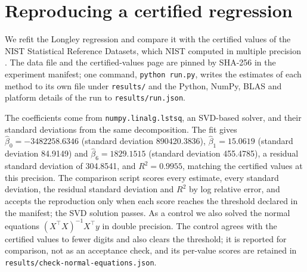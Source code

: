 \section{Reproducing a certified regression}\label{sec:res_longley}

We refit the Longley regression \cite{longley1967} and compare it with the certified values of the NIST Statistical Reference Datasets, which NIST computed in multiple precision \cite{nist-strd-longley}. The data file and the certified-values page are pinned by SHA-256 in the experiment manifest; one command, \texttt{python run.py}, writes the estimates of each method to its own file under \texttt{results/} and the Python, NumPy, BLAS and platform details of the run to \texttt{results/run.json}.

The coefficients come from \texttt{numpy.linalg.lstsq}, an SVD-based solver, and their standard deviations from the same decomposition. The fit gives $\hat\beta_0 = -3482258.6346$ (standard deviation 890420.3836), $\hat\beta_1 = 15.0619$ (standard deviation 84.9149) and $\hat\beta_6 = 1829.1515$ (standard deviation 455.4785), a residual standard deviation of 304.8541, and $R^2 = 0.9955$, matching the certified values at this precision. The comparison script scores every estimate, every standard deviation, the residual standard deviation and $R^2$ by log relative error, and accepts the reproduction only when each score reaches the threshold declared in the manifest; the SVD solution passes. As a control we also solved the normal equations $(X^\top X)^{-1} X^\top y$ in double precision. The control agrees with the certified values to fewer digits and also clears the threshold; it is reported for comparison, not as an acceptance check, and its per-value scores are retained in \texttt{results/check-normal-equations.json}.
